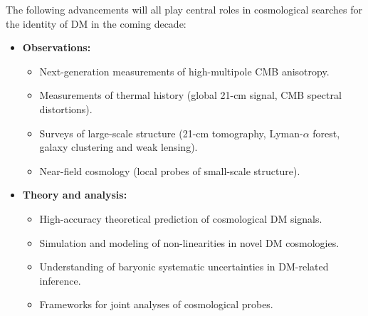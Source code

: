 \documentclass[12pt]{article}
\begin{document}
The following advancements will all play central roles in cosmological searches for the identity of DM in the coming decade:
\vspace{-0.cm}
\begin{itemize}
    \item \textbf{Observations:}
    \begin{itemize}
        \item Next-generation measurements of high-multipole CMB anisotropy.
        \item Measurements of thermal history (global 21-cm signal, CMB spectral distortions).
        \item Surveys of large-scale structure (21-cm tomography, Lyman-$\alpha$ forest, galaxy clustering and weak lensing).
        \item Near-field cosmology (local probes of small-scale structure).
    \end{itemize}
    \vspace{-0.2cm}
    \item \textbf{Theory and analysis:}
    \begin{itemize}
        \item High-accuracy theoretical prediction of cosmological DM signals.
        \item Simulation and modeling of non-linearities in novel DM cosmologies.
        \item Understanding of baryonic systematic uncertainties in DM-related inference.
        \item Frameworks for joint analyses of cosmological probes.
        \end{itemize}
\end{itemize}
\pagebreak


\end{document}
